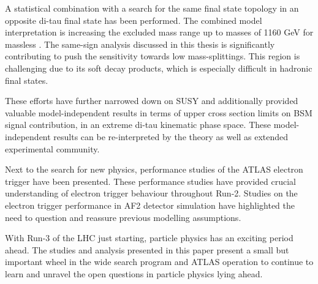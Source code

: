 A statistical combination with a search for the same final state topology in an opposite di-tau final state has been performed.  The combined model interpretation is increasing the excluded mass range up to \Cone masses of  1160 GeV for massless \None.  The same-sign analysis discussed in this thesis is significantly contributing to push the sensitivity towards low mass-splittings.  This region is challenging due to its soft decay products,  which is especially difficult in hadronic final states.  

These efforts have further narrowed down on \ac{SUSY} and additionally provided valuable model-independent results in terms of upper cross section limits on \ac{BSM} signal contribution,  in an extreme di-tau kinematic phase space.  These model-independent results can be re-interpreted by the theory as well as extended experimental community. 

Next to the search for new physics,  performance studies of the \ac{ATLAS} electron trigger have been presented.  These performance studies have provided crucial understanding of electron trigger behaviour throughout Run-2.  Studies on the electron trigger performance in AF2 detector simulation have highlighted the need to question and reassure previous modelling assumptions.

With Run-3 of the \ac{LHC} just starting,  particle physics has an exciting period ahead.  The studies and analysis presented in this paper present a small but important wheel in the wide search program and \ac{ATLAS} operation to continue to learn and unravel the open questions in particle physics lying ahead. 



